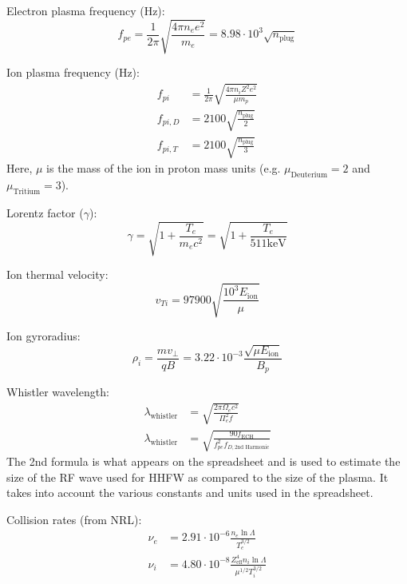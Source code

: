 Electron plasma frequency (Hz):
\begin{equation}
    f_{pe} = \frac{1}{2 \pi} \sqrt{\frac{4\pi n_e e^2}{m_e}} = 8.98 \cdot 10^3\sqrt{n_{\text{plug}}}
\end{equation}

Ion plasma frequency (Hz):
\begin{align}
    f_{pi} &= \frac{1}{2\pi}\sqrt{\frac{4\pi n_i Z^2 e^2}{\mu m_p}} \\
    f_{pi,D} &= 2100 \sqrt{\frac{n_{\text{plug}}}{2}} \\
    f_{pi,T} &= 2100 \sqrt{\frac{n_{\text{plug}}}{3}}
\end{align}
Here, $\mu$ is the mass of the ion in proton mass units (e.g. $\mu_{\text{Deuterium}}=2$ and $\mu_{\text{Tritium}}=3$).

Lorentz factor ($\gamma$):
\begin{equation}
    \gamma = \sqrt{1+ \frac{T_e}{m_e c^2}} = \sqrt{1 + \frac{T_e}{511 \text{keV}}}
\end{equation}

Ion thermal velocity:
\begin{equation}
    v_{Ti}=97900\sqrt{\frac{10^3E_{\text{ion}}}{\mu}}
\end{equation}

Ion gyroradius: 
\begin{equation}
    \rho_i = \frac{m v_\perp}{q B} = 3.22\cdot 10^{-3} \frac{\sqrt{\mu E_{\text{ion}}}}{B_p}
\end{equation}

Whistler wavelength:
\begin{align}
    \lambda_{\text{whistler}} &= \sqrt{\frac{2\pi\Omega_e c^2}{\Pi_e^2 f}} \\
    \lambda_{\text{whistler}} &= \sqrt{\frac{90 f_{\text{ECH}}}{f_{pe}^2 f_{D,\text{2nd Harmonic}}}}
\end{align}
The 2nd formula is what appears on the spreadsheet and is used to estimate the size of the RF wave used for HHFW as compared to the size of the plasma. It takes into account the various constants and units used in the spreadsheet.

Collision rates (from NRL):
\begin{align}
    \nu_e &= 2.91\cdot10^{-6}\frac{n_e \ln\Lambda}{T_e^{3/2}} \\
    \nu_i &= 4.80\cdot10^{-8}\frac{Z_{\text{eff}}^4n_i\ln\Lambda}{\mu^{1/2}T_i^{3/2}}
\end{align}


